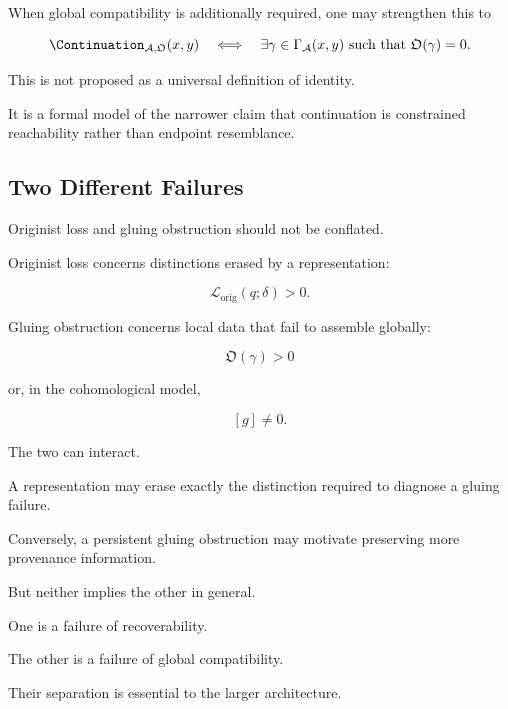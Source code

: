 \documentclass[
  11pt,
  a4paper,
  DIV=12,
  BCOR=0mm,
  parskip=half-
]{scrartcl}
\newcommand{\lossorig}{%
  \mathscr L_{\mathrm{orig}}%
}
\theoremstyle{definition}
\theoremstyle{plain}
\theoremstyle{remark}
\begin{document}
When global compatibility is additionally required, one may strengthen this
to

\[
  \Continuation_{\mathcal A,\mathfrak O}(x,y)
  \quad\Longleftrightarrow\quad
  \exists\gamma\in\Gamma_{\mathcal A}(x,y)
  \text{ such that }
  \mathfrak O(\gamma)=0.
\]

This is not proposed as a universal definition of identity.

It is a formal model of the narrower claim that continuation is constrained
reachability rather than endpoint resemblance.


\subsection{Two Different Failures}
\label{app:loss-vs-obstruction}

Originist loss and gluing obstruction should not be conflated.

Originist loss concerns distinctions erased by a representation:

\[
  \lossorig(q;\delta)>0.
\]

Gluing obstruction concerns local data that fail to assemble globally:

\[
  \mathfrak O(\gamma)>0
\]

or, in the cohomological model,

\[
  [g]\neq 0.
\]

The two can interact.

A representation may erase exactly the distinction required to diagnose a
gluing failure.

Conversely, a persistent gluing obstruction may motivate preserving more
provenance information.

But neither implies the other in general.

One is a failure of recoverability.

The other is a failure of global compatibility.

Their separation is essential to the larger architecture.

\end{document}
